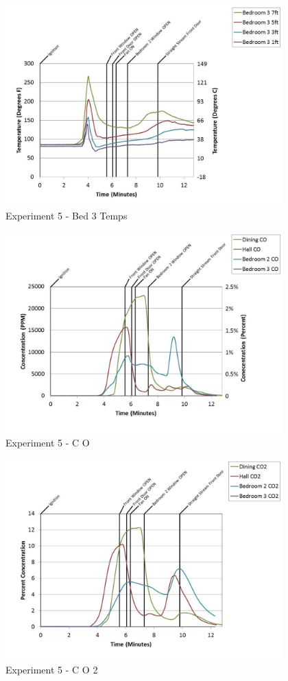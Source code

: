 \documentclass{article}
\begin{document}
\begin{appendices}
	\clearpage

	\begin{figure}[h!]
		\centering
		\includegraphics[height=3.05in]{0_Images/Results_Charts/Exp_5_Charts/Bed3Temps.pdf}
		\caption{Experiment 5 - Bed 3 Temps}
	\end{figure}
 

	\begin{figure}[h!]
		\centering
		\includegraphics[height=3.05in]{0_Images/Results_Charts/Exp_5_Charts/CO.pdf}
		\caption{Experiment 5 - C O}
	\end{figure}
 
	\clearpage

	\begin{figure}[h!]
		\centering
		\includegraphics[height=3.05in]{0_Images/Results_Charts/Exp_5_Charts/CO2.pdf}
		\caption{Experiment 5 - C O 2}
	\end{figure}
 


\end{appendices}
\end{document}
